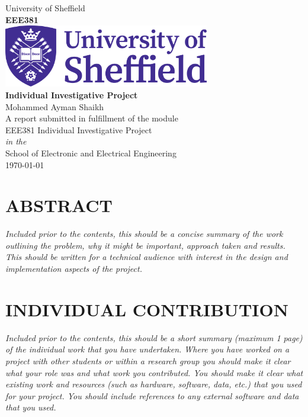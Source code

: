 \documentclass[12pt,a4paper]{report}
\begin{document}
\setcounter{tocdepth}{0} 
\renewcommand\labelitemi{---}


\begin{titlepage}
\begin{center}
{\LARGE University of Sheffield}\\[1.5cm]
\linespread{1.2}\Large {\bfseries EEE381}\\[2cm]
\linespread{1}
\includegraphics[width=9cm]{images/logo.png}\\[1.5cm]

\linespread{1.2}\Large {\bfseries Individual Investigative Project}\\[1cm]
{\Large Mohammed Ayman Shaikh}\\[1cm]
\large A report submitted in fulfillment of the module\\EEE381 Individual Investigative Project\\[0.3cm] 
\textit{in the}\\[0.3cm]
School of Electronic and Electrical Engineering\\[2cm]
\today
\end{center}

\end{titlepage}


\linespread{1.5}

\section*{ABSTRACT}
\textit{Included prior to the contents, this should be a concise summary of the work
outlining the problem, why it might be important, approach taken and results. This should
be written for a technical audience with interest in the design and implementation aspects
of the project.}

\newpage \section*{INDIVIDUAL CONTRIBUTION}
\textit{Included prior to the contents, this should be a short summary
(maximum 1 page) of the individual work that you have undertaken. Where you have
worked on a project with other students or within a research group you should make it
clear what your role was and what work you contributed. You should make it clear what
existing work and resources (such as hardware, software, data, etc.) that you used for your
project. You should include references to any external software and data that you used.}
\end{document}

